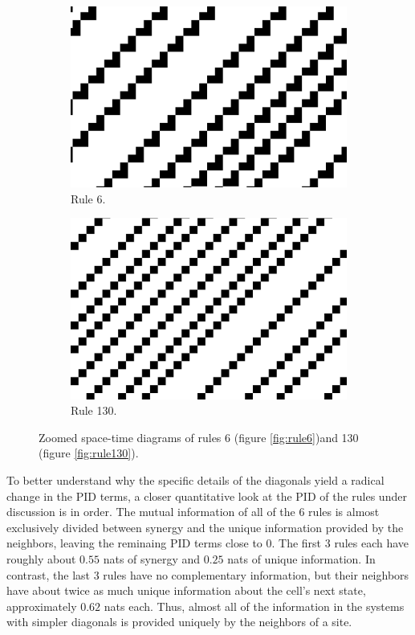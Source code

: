 \documentclass[12pt]{article}
\begin{document}
\begin{figure} [!h]
\begin{subfigure}{.5\textwidth}
  \centering
  \includegraphics[width=.9\linewidth]{rule6-zoomed}
  \caption{Rule 6.}
  \label{fig:rule6-zoomed}
\end{subfigure}%
\begin{subfigure}{.5\textwidth}
  \centering
  \includegraphics[width=.9\linewidth]{rule130-zoomed}
  \caption{Rule 130.}
  \label{fig:rule130-zoomed}
\end{subfigure}
\caption{Zoomed space-time diagrams of rules 6 (figure \ref{fig:rule6})and 130 (figure \ref{fig:rule130}).} 
\label{fig:eca-diagonals-zoomed}
\end{figure}

To better understand why the specific details of the diagonals yield a radical change in the PID terms, a closer quantitative look at the PID of the rules under discussion is in order. The mutual information of all of the 6 rules is almost exclusively divided between synergy and the unique information provided by the neighbors, leaving the reminaing PID terms close to 0. The first 3 rules each have roughly about $0.55$ nats of synergy and $0.25$ nats of unique information. In contrast, the last 3 rules have no complementary information, but their neighbors have about twice as much unique information about the cell's next state, approximately $0.62$ nats each. Thus, almost all of the information in the systems with simpler diagonals is provided uniquely by the neighbors of a site. 
\end{document}
